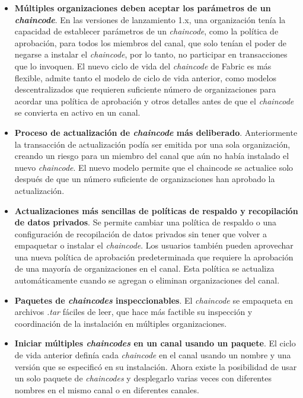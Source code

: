 {\begin{itemize}
\item {\bf M\'ultiples organizaciones deben aceptar los par\'ametros de un \emph{chaincode}}. En las versiones de lanzamiento 1.x, una organizaci\'on ten\'ia la capacidad de establecer par\'ametros de un \emph{chaincode}, como la pol\'itica de aprobaci\'on, para todos los miembros del canal, que solo ten\'ian el poder de negarse a instalar el \emph{chaincode}, por lo tanto, no participar en transacciones que lo invoquen. El nuevo ciclo de vida del \emph{chaincode} de Fabric es m\'as flexible, admite tanto el modelo de ciclo de vida anterior, como modelos descentralizados que requieren suficiente n\'umero de organizaciones para acordar una pol\'itica de aprobaci\'on y otros detalles antes de que el \emph{chaincode} se convierta en activo en un canal.

\item {\bf Proceso de actualizaci\'on de \emph{chaincode} m\'as deliberado}. Anteriormente la transacci\'on de actualizaci\'on pod\'ia ser emitida por una sola organizaci\'on, creando un riesgo para un miembro del canal que a\'un no hab\'ia instalado el nuevo \emph{chaincode}. El nuevo modelo permite que el chaincode se actualice solo despu\'es de que un n\'umero suficiente de organizaciones han aprobado la actualizaci\'on.

\item {\bf Actualizaciones m\'as sencillas de pol\'iticas de respaldo y recopilaci\'on de datos privados}. Se permite cambiar una pol\'itica de respaldo o una configuraci\'on de recopilaci\'on de datos privados sin tener que volver a empaquetar o instalar el \emph{chaincode}. Los usuarios tambi\'en pueden aprovechar una nueva pol\'itica de aprobaci\'on predeterminada que requiere la aprobaci\'on de una mayor\'ia de organizaciones en el canal. Esta pol\'itica se actualiza autom\'aticamente cuando se agregan o eliminan organizaciones del canal.

\item {\bf Paquetes de \emph{chaincodes} inspeccionables}. El \emph{chaincode} se empaqueta en archivos \emph{.tar} f\'aciles de leer, que hace m\'as factible su inspecci\'on y coordinaci\'on de la instalaci\'on en m\'ultiples organizaciones.

\item {\bf Iniciar m\'ultiples \emph{chaincodes} en un canal usando un paquete}. El ciclo de vida anterior defin\'ia cada \emph{chaincode} en el canal usando un nombre y una versi\'on que se especific\'o en su instalaci\'on. Ahora existe la posibilidad de usar un solo paquete de \emph{chaincodes} y desplegarlo varias veces con diferentes nombres en el mismo canal o en diferentes canales.


\end{itemize}}
